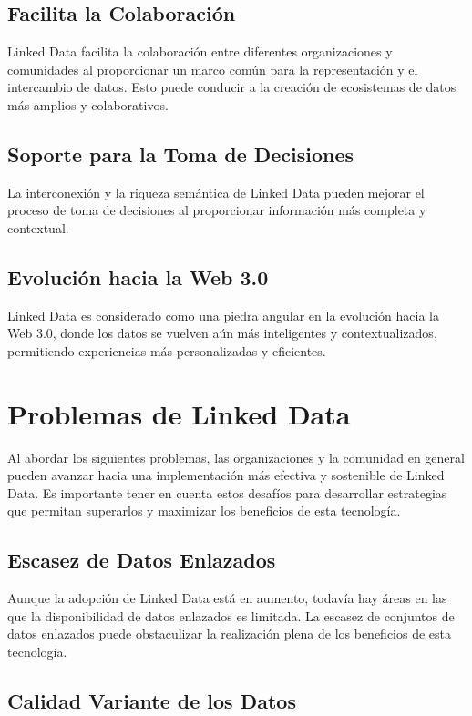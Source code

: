 \documentclass[11pt]{report}
\begin{document}
\section{Facilita la Colaboración}

		Linked Data facilita la colaboración entre diferentes organizaciones y comunidades al proporcionar un marco común para la representación y el intercambio de datos. Esto puede conducir a la creación de ecosistemas de datos más amplios y colaborativos.
\section{Soporte para la Toma de Decisiones}

		La interconexión y la riqueza semántica de Linked Data pueden mejorar el proceso de toma de decisiones al proporcionar información más completa y contextual.
\section{Evolución hacia la Web 3.0}

		Linked Data es considerado como una piedra angular en la evolución hacia la Web 3.0, donde los datos se vuelven aún más inteligentes y contextualizados, permitiendo experiencias más personalizadas y eficientes.

\chapter{Problemas de Linked Data}
Al abordar los siguientes problemas, las organizaciones y la comunidad en general pueden avanzar hacia una implementación más efectiva y sostenible de Linked Data. Es importante tener en cuenta estos desafíos para desarrollar estrategias que permitan superarlos y maximizar los beneficios de esta tecnología.

\section{Escasez de Datos Enlazados}

		Aunque la adopción de Linked Data está en aumento, todavía hay áreas en las que la disponibilidad de datos enlazados es limitada. La escasez de conjuntos de datos enlazados puede obstaculizar la realización plena de los beneficios de esta tecnología.
\section{Calidad Variante de los Datos}
\end{document}
